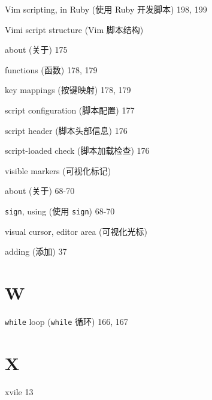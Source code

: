 \begin{multicols}{2}
\hangindent=2pc  Vim scripting, in Ruby (使用 Ruby 开发脚本) 198, 199

\hangindent=2pc  Vimi script structure (Vim 脚本结构) \par
\hangindent=2pc \quad about (关于) 175 \par
\hangindent=2pc \quad functions (函数) 178, 179 \par
\hangindent=2pc \quad key mappings (按键映射) 178, 179 \par
\hangindent=2pc \quad script configuration (脚本配置) 177 \par
\hangindent=2pc \quad script header (脚本头部信息) 176 \par
\hangindent=2pc \quad script-loaded check (脚本加载检查) 176 \par

\hangindent=2pc  visible markers (可视化标记) \par
\hangindent=2pc \quad about (关于) 68-70 \par
\hangindent=2pc \quad \texttt{sign}, using (使用 \texttt{sign}) 68-70 \par

\hangindent=2pc  visual cursor, editor area (可视化光标) \par
\hangindent=2pc \quad adding (添加) 37 \par

\hangindent=2pc  \section*{W}

\hangindent=2pc  \texttt{while} loop (\texttt{while} 循环) 166, 167

\hangindent=2pc  \section*{X}

\hangindent=2pc  xvile 13

\hangindent=2pc  \end{multicols}
